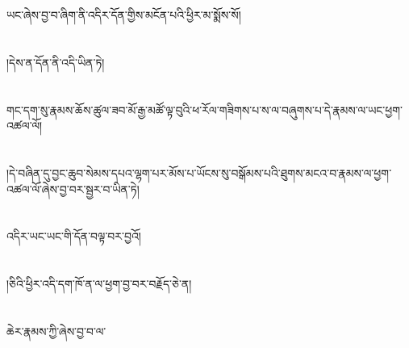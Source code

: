 ཡང་ཞེས་བྱ་བ་ཞིག་ནི་འདིར་དོན་གྱིས་མངོན་པའི་ཕྱིར་མ་སྨོས་སོ།\chapter{ }།དེས་ན་དོན་ནི་འདི་ཡིན་ཏེ།\chapter{ }གང་དག་སུ་རྣམས་ཆོས་ཚུལ་ཟབ་མོ་རྒྱ་མཚོ་ལྟ་བུའི་ཕ་རོལ་གཟིགས་པ་ས་ལ་བཞུགས་པ་དེ་རྣམས་ལ་ཡང་ཕྱག་འཚལ་ལོ།\chapter{ }།དེ་བཞིན་དུ་བྱང་ཆུབ་སེམས་དཔའ་ལྷག་པར་མོས་པ་ཡོངས་སུ་བསྒོམས་པའི་ཐུགས་མངའ་བ་རྣམས་ལ་ཕྱག་འཚལ་ལོ་ཞེས་བྱ་བར་སྦྱར་བ་ཡིན་ཏེ།\chapter{ }འདིར་ཡང་ཡང་གི་དོན་བལྟ་བར་བྱའོ།\chapter{ }།ཅིའི་ཕྱིར་འདི་དག་ཁོ་ན་ལ་ཕྱག་བྱ་བར་བརྗོད་ཅེ་ན།\chapter{ }ཆེར་རྣམས་ཀྱི་ཞེས་བྱ་བ་ལ་